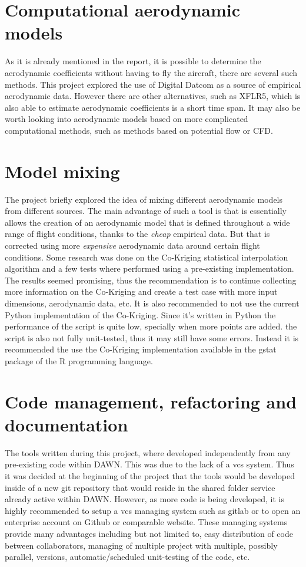 \section{Computational aerodynamic models}
As it is already mentioned in the report, it is possible to determine the aerodynamic coefficients without having to fly the aircraft, there are several such methods. This project explored the use of Digital Datcom as a source of empirical aerodynamic data. However there are other alternatives, such as XFLR5, which is also able to estimate aerodynamic coefficients is a short time span.
It may also be worth looking into aerodynamic models based on more complicated computational methods, such as methods based on potential flow or CFD. \\


\section{Model mixing}
The project briefly explored the idea of mixing different aerodynamic models from different sources. The main advantage of such a tool is that is essentially allows the creation of an aerodynamic model that is defined throughout a wide range of flight conditions, thanks to the \textit{cheap} empirical data. But that is corrected using more \textit{expensive} aerodynamic data around certain flight conditions.
Some research was done on the Co-Kriging statistical interpolation algorithm and a few tests where performed using a pre-existing implementation. The results seemed promising, thus the recommendation is to continue collecting more information on the Co-Kriging and create a test case with more input dimensions, aerodynamic data, etc. 
It is also recommended to not use the current Python implementation of the Co-Kriging. Since it's written in Python the performance of the script is quite low, specially when more points are added. the script is also not fully unit-tested, thus it may still have some errors. 
Instead it is recommended the use the Co-Kriging implementation available in the gstat package of the R programming language.

\section{Code management, refactoring and documentation}
The tools written during this project, where developed independently from any pre-existing code within DAWN. This was due to the lack of a \gls{vcs} system. Thus it was decided at the beginning of the project that the tools would be developed inside of a new git repository that would reside in the shared folder service already active within DAWN.
However, as more code is being developed, it is highly recommended to setup a \gls{vcs} managing system such as gitlab or to open an enterprise account on Github or comparable website. These managing systems provide many advantages including but not limited to, easy distribution of code between collaborators, managing of multiple project with multiple, possibly parallel, versions, automatic/scheduled unit-testing of the code, etc. \\

